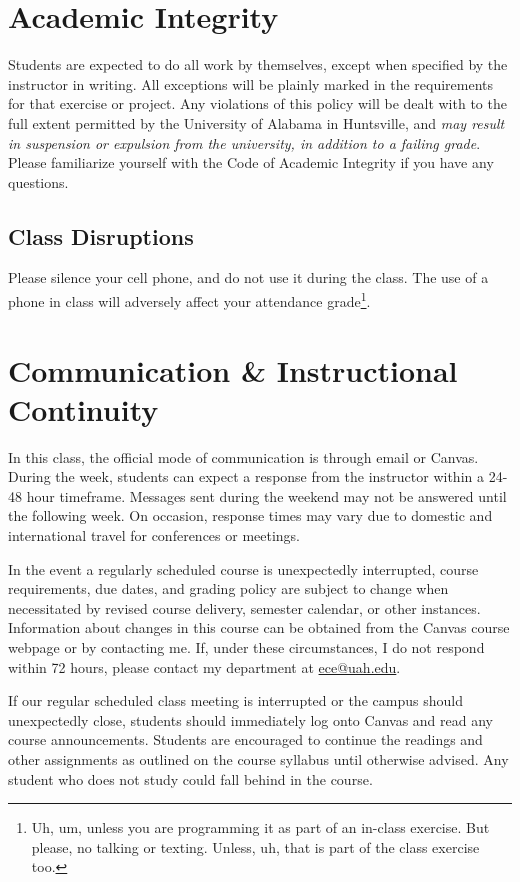 \documentclass[11pt]{report}
\begin{document}
\chapter{Academic Integrity}
Students are expected to do all work by themselves, except when specified by the instructor in writing. All exceptions will be plainly marked in the requirements for that exercise or project. Any violations of this policy will be dealt with to the full extent permitted by the University of Alabama in Huntsville, and \emph{may result in suspension or expulsion from the university, in addition to a failing grade}. Please familiarize yourself with the Code of Academic Integrity if you have any questions.

\section*{Class Disruptions}
Please silence your cell phone, and do not use it during the class. The use of a phone in class will adversely affect your attendance grade\footnote{Uh, um, unless you are programming it as part of an in-class exercise. But please, no talking or texting. Unless, uh, that is part of the class exercise too.}.

\chapter{Communication \& Instructional Continuity}
In this class, the official mode of communication is through email or Canvas. During the week, students can expect a response from the instructor within a 24-48 hour timeframe. Messages sent during the weekend may not be answered until the following week. On occasion, response times may vary due to domestic and international travel for conferences or meetings.

In the event a regularly scheduled course is unexpectedly interrupted, course requirements, due dates, and grading policy are subject to change when necessitated by revised course delivery, semester calendar, or other instances. Information about changes in this course can be obtained from the Canvas course webpage or by contacting me. If, under these circumstances, I do not respond within 72 hours, please contact my department at \href{mailto:ece@uah.edu}{ece@uah.edu}.

If our regular scheduled class meeting is interrupted or the campus should unexpectedly close, students should immediately log onto Canvas and read any course announcements. Students are encouraged to continue the readings and other assignments as outlined on the course syllabus until otherwise advised. Any student who does not study could fall behind in the course.
\end{document}
